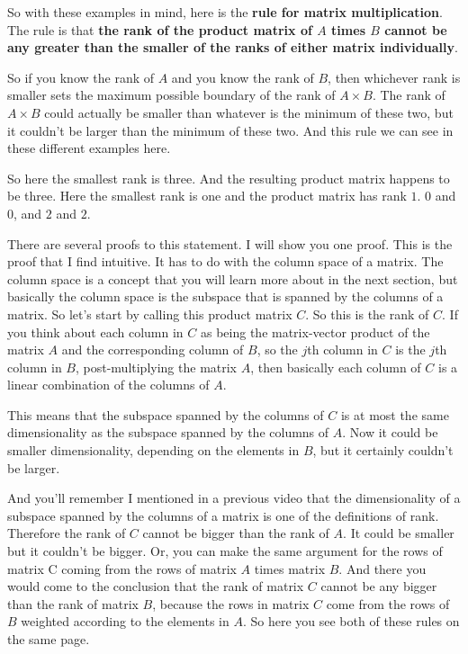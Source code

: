 \documentclass[fleqn,10pt]{olplainarticle}
\theoremstyle{definition}
\theoremstyle{remark}
\begin{document}
So with these examples in mind, here is the \textbf{rule for matrix multiplication}. The rule is that \textbf{the rank of the product matrix of $A$ times $B$ cannot be any greater than the smaller of the ranks of either matrix individually}.

So if you know the rank of $A$ and you know the rank of $B$, then whichever rank is smaller sets the maximum possible boundary of the rank of $A \times B$. The rank of $A \times B$ could actually be smaller than whatever is the minimum of these two, but it couldn't be larger than the minimum of these two. And this rule we can see in these different examples here.

So here the smallest rank is three. And the resulting product matrix happens to be three. Here the smallest rank is one and the product matrix has rank $1$. $0$ and $0$, and $2$ and $2$.

There are several proofs to this statement. I will show you one proof. This is the proof that I find intuitive. It has to do with the column space of a matrix. The column space is a concept that you will learn more about in the next section, but basically the column space is the subspace that is spanned by the columns of a matrix. So let's start by calling this product matrix $C$. So this is the rank of $C$. If you think about each column in $C$ as being the matrix-vector product of the matrix $A$ and the corresponding column of $B$, so the $j$th column in $C$ is the $j$th column in $B$, post-multiplying the matrix $A$, then basically each column of $C$ is a linear combination of the columns of $A$.

This means that the subspace spanned by the columns of $C$ is at most the same dimensionality as the subspace spanned by the columns of $A$. Now it could be smaller dimensionality, depending on the elements in $B$, but it certainly couldn't be larger.

And you'll remember I mentioned in a previous video that the dimensionality of a subspace spanned by the columns of a matrix is one of the definitions of rank. Therefore the rank of $C$ cannot be bigger than the rank of $A$. It could be smaller but it couldn't be bigger. Or, you can make the same argument for the rows of matrix C coming from the rows of matrix $A$ times matrix $B$. And there you would come to the conclusion that the rank of matrix $C$ cannot be any bigger than the rank of matrix $B$, because the rows in matrix $C$ come from the rows of $B$ weighted according to the elements in $A$. So here you see both of these rules on the same page.
\end{document}
